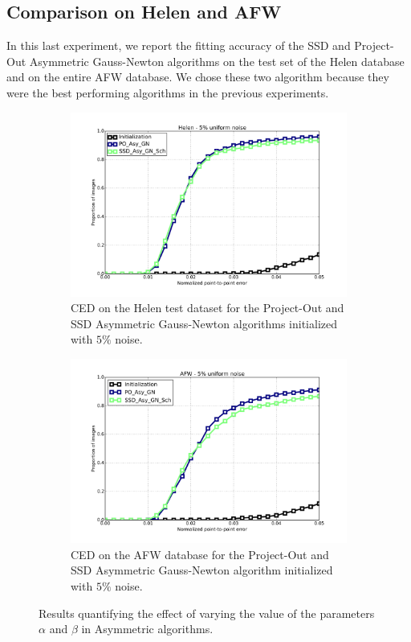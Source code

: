 \subsection{Comparison on Helen and AFW}

In this last experiment, we report the fitting accuracy of the SSD and Project-Out Asymmetric Gauss-Newton algorithms on the test set of the Helen database and on the entire AFW database. We chose these two algorithm because they were the best performing algorithms in the previous experiments. 

\begin{figure}[h!]
	\centering
	\begin{subfigure}{0.48\textwidth}
	    \includegraphics[width=\textwidth]{experiments/best/ced_helen_5.png}
	    \caption{CED on the Helen test dataset for the Project-Out and SSD Asymmetric Gauss-Newton algorithms initialized with $5\%$ noise.}
	    \label{fig:ced_po_for_gn}
	\end{subfigure}
	\hfill
	\begin{subfigure}{0.48\textwidth}
	    \includegraphics[width=\textwidth]{experiments/best/ced_afw_5.png}
	    \caption{CED on the AFW database for the Project-Out and SSD Asymmetric Gauss-Newton algorithm initialized with $5\%$ noise.}
	    \label{fig:ced_po_inv_gn}
	\end{subfigure}
	\label{fig:alpha}
	\caption{Results quantifying the effect of varying the value of the parameters $\alpha$ and $\beta$ in Asymmetric algorithms.}
\end{figure}

